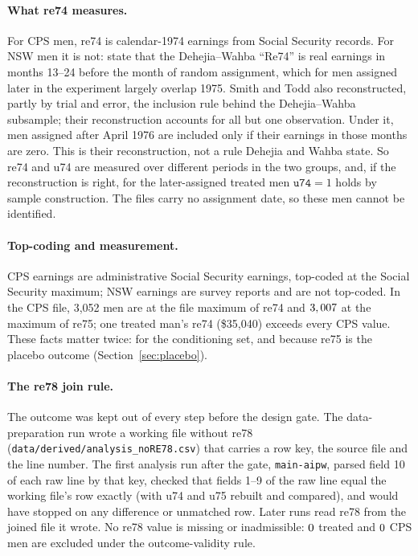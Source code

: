 \documentclass[11pt]{article}
\newcommand{\var}[1]{\texttt{#1}}
\newcommand{\run}[1]{\texttt{#1}}
\begin{document}
\paragraph{What re74 measures.} For CPS men, re74 is calendar-1974 earnings from Social
Security records. For NSW men it is not: \citet[Sec.~5]{smith2005} state that the
Dehejia--Wahba ``Re74'' is real earnings in months 13--24 before the month of random
assignment, which for men assigned later in the experiment largely overlap 1975. Smith and
Todd also reconstructed, partly by trial and error, the inclusion rule behind the
Dehejia--Wahba subsample; their reconstruction accounts for all but one observation. Under
it, men assigned after April 1976 are included only if their earnings in those months are
zero. This is their reconstruction, not a rule Dehejia and Wahba state. So re74 and u74 are
measured over different periods in the two groups, and, if the reconstruction is right, for
the later-assigned treated men $\var{u74} = 1$ holds by sample construction. The files carry no assignment date, so these
men cannot be identified.

\paragraph{Top-coding and measurement.} CPS earnings are administrative Social Security
earnings, top-coded at the Social Security maximum; NSW earnings are survey reports and are
not top-coded. In the CPS file, 3,052 men are at the file maximum of re74 and
$3,007$ at the maximum of re75; one treated man's re74 (\$35,040)
exceeds every CPS value. These facts matter twice: for the conditioning set, and because
re75 is the placebo outcome (Section~\ref{sec:placebo}).

\paragraph{The re78 join rule.} The outcome was kept out of every step before the design
gate. The data-preparation run wrote a working file without re78
(\var{data/derived/analysis\_noRE78.csv}) that carries a row key, the source file and the
line number. The first analysis run after the gate, \run{main-aipw}, parsed field 10 of each
raw line by that key, checked that fields 1--9 of the raw line equal the working file's row
exactly (with u74 and u75 rebuilt and compared), and would have stopped on any difference
or unmatched row. Later runs read re78 from the joined file it wrote. No re78 value is
missing or inadmissible: $0$ treated and
$0$ CPS men are excluded under the outcome-validity rule.
\end{document}
